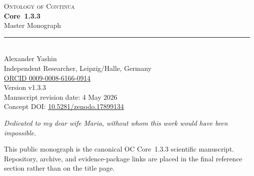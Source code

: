 \begin{titlepage}
\label{sec:oc133-title-page}
\thispagestyle{empty}
\begin{center}
\vspace*{1.0cm}
{\sffamily\Large\color{ocTitleBlue}\textsc{Ontology of Continua}}\\[0.38cm]
{\sffamily\Huge\bfseries Core~1.3.3}\\[0.28cm]
{\sffamily\Large Master Monograph}\\[0.75cm]
{\color{ocTitleGold}\rule{0.42\textwidth}{0.5pt}}\\[0.95cm]

{\Large Alexander Yashin}\\[0.2cm]
{\normalsize Independent Researcher, Leipzig/Halle, Germany}\\[0.2cm]
{\normalsize \href{https://orcid.org/0009-0008-6166-0914}{ORCID 0009-0008-6166-0914}}\\[1.0cm]

{\normalsize Version v1.3.3}\\[0.3cm]
{\normalsize Manuscript revision date: 4 May 2026}\\[0.3cm]
{\normalsize Concept DOI: \href{https://doi.org/10.5281/zenodo.17899134}{10.5281/zenodo.17899134}}\\[0.9cm]

\vfill

{\small\itshape Dedicated to my dear wife Maria, without whom this work would have been impossible.}\\[0.8cm]

\begin{minipage}{0.86\textwidth}
\centering\scriptsize
This public monograph is the canonical OC Core~1.3.3 scientific manuscript.
Repository, archive, and evidence-package links are placed in the final reference section rather than on the title page.
\end{minipage}
\end{center}
\end{titlepage}

